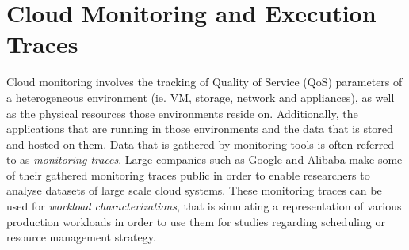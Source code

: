




    \section{Cloud Monitoring and Execution Traces}
    \label{sec:public-cloud-provider-traces-in-available-data-related-work}

        Cloud monitoring involves the tracking of Quality of Service (QoS) parameters of a heterogeneous environment (ie. VM, storage, network and appliances), as well as the physical resources those environments reside on. Additionally, the applications that are running in those environments and the data that is stored and hosted on them.
        Data that is gathered by monitoring tools is often referred to as \emph{monitoring traces}.
        Large companies such as Google and Alibaba make some of their gathered monitoring traces public in order to enable researchers to analyse datasets of large scale cloud systems.
        These monitoring traces can be used for \emph{workload characterizations}, that is simulating a representation of various production workloads in order to use them for studies regarding scheduling or resource management strategy.

